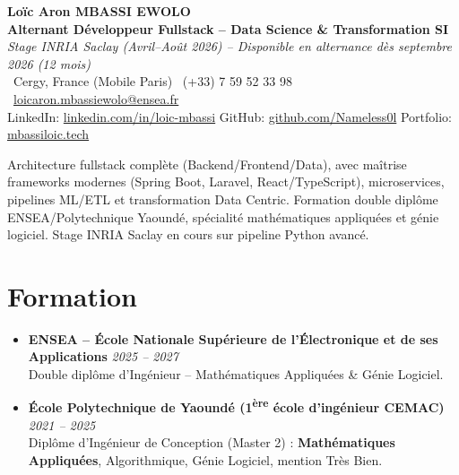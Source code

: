\documentclass[a4paper,11pt]{article}
\begin{document}
\begin{center}
    {\Large \textbf{Lo\"ic Aron MBASSI EWOLO}} \\ \vspace{4pt}
    \textbf{\large Alternant D\'eveloppeur Fullstack -- Data Science \& Transformation SI} \\
    \textit{\small Stage INRIA Saclay (Avril--Ao\^ut 2026) -- Disponible en alternance d\`es septembre 2026 (12 mois)} \\ \vspace{4pt}
    \small
    \Pointinghand\ Cergy, France (Mobile Paris) \quad \Mobilefone\ (+33) 7 59 52 33 98 \quad
    {\color{primary}\Letter\ \href{mailto:loicaron.mbassiewolo@ensea.fr}{loicaron.mbassiewolo@ensea.fr}} \\ \vspace{2pt}
    {\color{primary}LinkedIn: \href{https://www.linkedin.com/in/loic-mbassi/}{linkedin.com/in/loic-mbassi}} \quad
    {\color{primary}GitHub: \href{https://github.com/Nameless0l}{github.com/Nameless0l}} \quad
    {\color{primary}Portfolio: \href{https://mbassiloic.tech}{mbassiloic.tech}}
\end{center}
\vspace{-6pt}
\noindent\small{Architecture fullstack complète (Backend/Frontend/Data), avec maîtrise frameworks modernes (Spring Boot, Laravel, React/TypeScript), microservices, pipelines ML/ETL et transformation Data Centric. Formation double diplôme ENSEA/Polytechnique Yaoundé, spécialité mathématiques appliquées et génie logiciel. Stage INRIA Saclay en cours sur pipeline Python avanc\'e.}

\section{Formation}
\begin{itemize}[leftmargin=*, label=\tiny$\bullet$, nosep]
    \item \textbf{ENSEA -- \'Ecole Nationale Sup\'erieure de l'\'Electronique et de ses Applications} \hfill \textit{2025 -- 2027} \\
    \small{Double dipl\^ome d'Ing\'enieur -- Math\'ematiques Appliqu\'ees \& G\'enie Logiciel.}
    \item \textbf{\'Ecole Polytechnique de Yaound\'e (1\textsuperscript{\`ere} \'ecole d'ing\'enieur CEMAC)} \hfill \textit{2021 -- 2025} \\
    \small{Dipl\^ome d'Ing\'enieur de Conception (Master 2) : \textbf{Math\'ematiques Appliqu\'ees}, Algorithmique, G\'enie Logiciel, mention Tr\`es Bien.}
\end{itemize}
\end{document}
